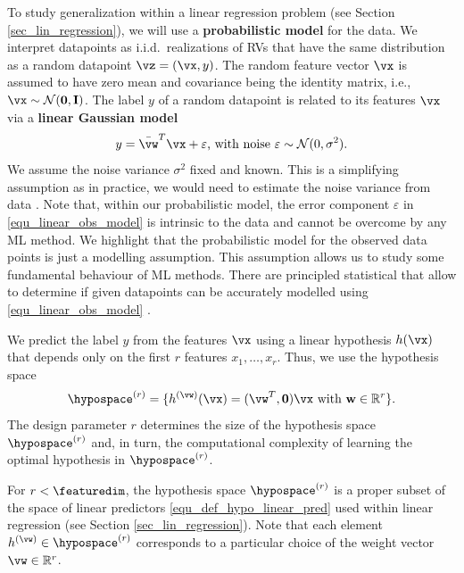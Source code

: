 \documentclass[12pt]{report}
\begin{document}
To study generalization within a linear regression problem 
(see Section \ref{sec_lin_regression}), we will use a {\bf probabilistic model} 
for the data. We interpret datapoints as i.i.d. realizations of RVs that have 
the same distribution as a random datapoint $\vz=(\vx,y)$. The random 
feature vector $\vx$ is assumed to have zero mean and covariance 
being the identity matrix, i.e., $\vx \sim \mathcal{N}(\mathbf{0}, \mathbf{I})$. 
The label $y$ of a random datapoint is related to its features $\vx$ via a 
{\bf linear Gaussian model} 
\begin{equation} 
\label{equ_linear_obs_model}
y = \bar{\vw}^{T}  \vx + \varepsilon \mbox{, with noise } \varepsilon \sim \mathcal{N}(0,\sigma^{2}).
\end{equation} 
We assume the noise variance $\sigma^{2}$ fixed and known. This is a simplifying assumption as in 
practice, we would need to estimate the noise variance from data \cite{Cohen2002}. Note that, within 
our probabilistic model, the error component $\varepsilon$ in \eqref{equ_linear_obs_model} is intrinsic 
to the data and cannot be overcome by any ML method. We highlight that the probabilistic model for 
the observed data points is just a modelling assumption. This assumption allows us to study some 
fundamental behaviour of ML methods. There are principled statistical that allow to determine if 
given datapoints can be accurately modelled using \eqref{equ_linear_obs_model} \cite{}. 

We predict the label $y$ from the features $\vx$ using a linear hypothesis $h(\vx)$ 
that depends only on the first $r$ features $x_{1},\ldots,x_{r}$. Thus, we use the 
hypothesis space 
\vspace*{-2mm}
\begin{equation}
\label{equ_generalization_hypospace_r}
\hypospace^{(r)} = \{ h^{(\vw)}(\vx)= (\vw^{T},\mathbf{0}) \vx \mbox{ with } \mathbf{w} \in \mathbb{R}^{r} \}.   
\vspace*{-1mm}
\end{equation}
The design parameter $r$ determines the size of the hypothesis space 
$\hypospace^{(r)}$ and, in turn, the computational complexity of learning 
the optimal hypothesis in $\hypospace^{(r)}$. 

For $r < \featuredim$, the hypothesis space $\hypospace^{(r)}$ 
is a proper subset of the space of linear predictors \eqref{equ_def_hypo_linear_pred} 
used within linear regression (see Section \ref{sec_lin_regression}). Note that 
each element $h^{(\vw)} \in \hypospace^{(r)}$ corresponds to a particular 
choice of the weight vector $\vw \in \mathbb{R}^{r}$. 
\end{document}
